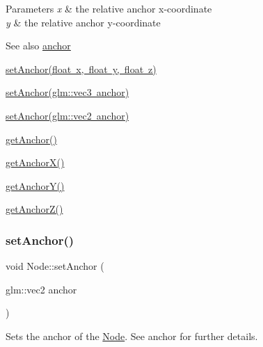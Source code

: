 \begin{DoxyParams}{Parameters}
{\em x} & the relative anchor x-\/coordinate \\
\hline
{\em y} & the relative anchor y-\/coordinate \\
\hline
\end{DoxyParams}
\begin{DoxySeeAlso}{See also}
\mbox{\hyperlink{classsage_1_1Node_a8698d732514fa2caba0ccee46dbae17a}{anchor}} 

\mbox{\hyperlink{classsage_1_1Node_a04d15cec594320725e6ef44756346d2a}{set\+Anchor(float x, float y, float z)}} 

\mbox{\hyperlink{classsage_1_1Node_a96a786cd6d6750d60c8195aa4895de7c}{set\+Anchor(glm\+::vec3 anchor)}} 

\mbox{\hyperlink{classsage_1_1Node_a957a7e578660950b8518926239397ea0}{set\+Anchor(glm\+::vec2 anchor)}} 

\mbox{\hyperlink{classsage_1_1Node_a1314e39981d8adee8a75c96f29c9e181}{get\+Anchor()}} 

\mbox{\hyperlink{classsage_1_1Node_aa5f31c33d60b32b618d3beaf4e5c6c51}{get\+Anchor\+X()}} 

\mbox{\hyperlink{classsage_1_1Node_a78c5f86d0081854603178fb52d8c0a9b}{get\+Anchor\+Y()}} 

\mbox{\hyperlink{classsage_1_1Node_a13d0e0b056b8e29091e385f17f8c62f6}{get\+Anchor\+Z()}} 
\end{DoxySeeAlso}
\mbox{\label{classsage_1_1Node_a957a7e578660950b8518926239397ea0}} 
\subsubsection{\texorpdfstring{setAnchor()}{setAnchor()}\hspace{0.1cm}{\footnotesize\ttfamily [4/4]}}
{\footnotesize\ttfamily void Node\+::set\+Anchor (\begin{DoxyParamCaption}\item[{glm\+::vec2}]{anchor }\end{DoxyParamCaption})}



Sets the anchor of the \mbox{\hyperlink{classsage_1_1Node}{Node}}. See anchor for further details. 


